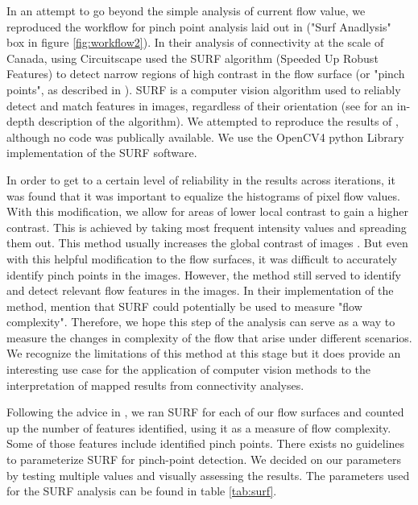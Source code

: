 In an attempt to go beyond the simple analysis of current flow value, we reproduced the workflow for pinch point analysis laid out in \cite{pelletier_forest_2017} ("Surf Anadlysis" box in figure \ref{fig:workflow2}). In their analysis of connectivity at the scale of Canada, using Circuitscape \citeauthor{pelletier_forest_2017} used the SURF algorithm (Speeded Up Robust Features) to detect narrow regions of high contrast in the flow surface (or "pinch points", as described in \cite{mcrae_using_2008}). SURF is a computer vision algorithm used to reliably detect and match features in images, regardless of their orientation (see \cite{leonardis_surf_2006} for an in-depth description of the algorithm). We attempted to reproduce the results of \citeauthor{pelletier_forest_2017}, although no code was publically available. We use the OpenCV4 python Library implementation of the SURF software.

In order to get to a certain level of reliability in the results across iterations, it was found that it was important to equalize the histograms of pixel flow values. With this modification, we allow for areas of lower local contrast to gain a higher contrast. This is achieved by taking most frequent intensity values and spreading them out. This method usually increases the global contrast of images \citep{garg_comparative_2017}. But even with this helpful modification to the flow surfaces, it was difficult to accurately identify pinch points in the images. However, the method still served to identify and detect relevant flow features in the images. In their implementation of the method, \citeauthor{pelletier_forest_2017} mention that SURF could potentially be used to measure "flow complexity". Therefore, we hope this step of the analysis can serve as a way to measure the changes in complexity of the flow that arise under different scenarios. We recognize the limitations of this method at this stage but it does provide an interesting use case for the application of computer vision methods to the interpretation of mapped results from connectivity analyses.

Following the advice in \citeauthor{pelletier_forest_2017}, we ran SURF for each of our flow surfaces and counted up the number of features identified, using it as a measure of flow complexity. Some of those features include identified pinch points. There exists no guidelines to parameterize SURF for pinch-point detection. We decided on our parameters by testing multiple values and visually assessing the results. The parameters used for the SURF analysis can be found in table \ref{tab:surf}.\\

